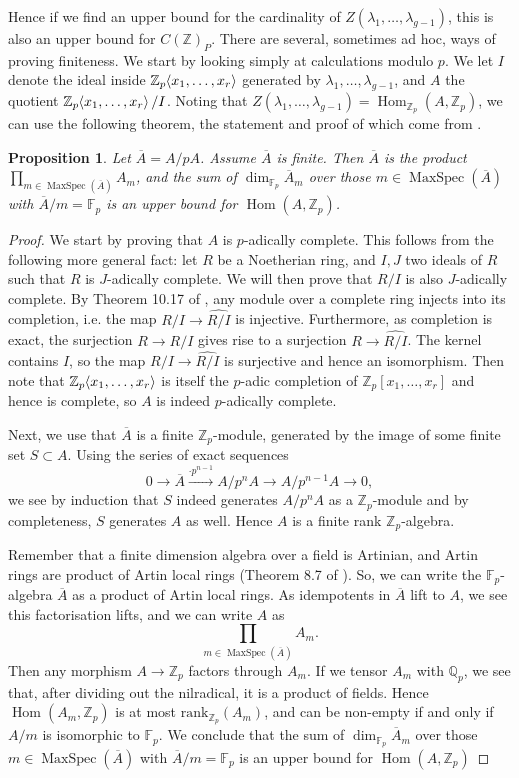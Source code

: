 \documentclass[12pt]{article}
\newcommand{\Z}{\mathbb{Z}}
\newcommand{\Q}{\mathbb{Q}}
\newcommand{\F}{\mathbb{F}}
\renewcommand{\angle}[1]{\hspace{-2pt}\left\langle #1 \right\rangle}
\DeclareMathOperator{\Hom}{Hom}
\DeclareMathOperator{\MaxSpec}{MaxSpec}
\theoremstyle{plain}
\newtheorem{prop}[thm]{Proposition} %
\theoremstyle{definition}
\theoremstyle{remark}
\begin{document}
Hence if we find an upper bound for the cardinality of $Z(\lambda_1,\dots,\lambda_{g-1})$, this is also an upper bound for $C(\Z)_P$. There are several, sometimes ad hoc, ways of proving finiteness. We start by looking simply at calculations modulo $p$. We let $I$ denote the ideal inside $\Z_p\angle{x_1,\dots,x_r}$ generated by $\lambda_1,\dots,\lambda_{g-1}$, and $A$ the quotient $\Z_p\angle{x_1,\dots,x_r}/I$. Noting that $Z(\lambda_1,\dots,\lambda_{g-1}) = \Hom_{\Z_p}(A,\Z_p)$, we can use the following theorem, the statement and proof of which come from \cite{edixhoven20}.

\begin{prop}
\label{prop:finedix}
Let $\overline{A} = A/pA$. Assume $\overline{A}$ is finite. Then $\overline{A}$ is the product $\prod_{m \in \MaxSpec(\overline{A})} A_m$, and the sum of $\dim_{\F_p} \overline{A}_m$ over those $m\in \MaxSpec(\overline{A})$ with $\overline{A}/m = \F_p$ is an upper bound for $\Hom(A,\Z_p)$.
\end{prop}
\begin{proof}
We start by proving that $A$ is $p$-adically complete. This follows from the following more general fact: let $R$ be a Noetherian ring, and $I,J$ two ideals of $R$ such that $R$ is $J$-adically complete. We will then prove that $R/I$ is also $J$-adically complete. By Theorem 10.17 of \cite{atiyah}, any module over a complete ring injects into its completion, i.e. the map $R/I \to \widehat{R/I}$ is injective. Furthermore, as completion is exact, the surjection $R \to R/I$ gives rise to a surjection $R \to \widehat{R/I}$. The kernel contains $I$, so the map $R/I \to \widehat{R/I}$ is surjective and hence an isomorphism. Then note that $\Z_p\angle{x_1,\dots,x_r}$ is itself the $p$-adic completion of $\Z_p[x_1,\dots,x_r]$ and hence is complete, so $A$ is indeed $p$-adically complete.

Next, we use that $\overline{A}$ is a finite $\Z_p$-module, generated by the image of some finite set $S \subset A$. Using the series of exact sequences \[0 \to \overline{A} \xrightarrow{\cdot p^{n-1}} A/p^nA \to A/p^{n-1}A \to 0,\] we see by induction that $S$ indeed generates $A/p^nA$ as a $\Z_p$-module and by completeness, $S$ generates $A$ as well. Hence $A$ is a finite rank $\Z_p$-algebra.

Remember that a finite dimension algebra over a field is Artinian, and Artin rings are product of Artin local rings (Theorem 8.7 of \cite{atiyah}). So, we can write the $\F_p$-algebra $\overline{A}$ as a product of Artin local rings. As idempotents in $\overline{A}$ lift to $A$, we see this factorisation lifts, and we can write $A$ as
\[
\prod_{m \in \MaxSpec(\overline{A})} A_m.
\]
Then any morphism $A \to \Z_p$ factors through $A_m$. If we tensor $A_m$ with $\Q_p$, we see that, after dividing out the nilradical, it is a product of fields. Hence $\Hom(A_m,\Z_p)$ is at most $\text{rank}_{\Z_p}(A_m)$, and can be non-empty if and only if $A/m$ is isomorphic to $\F_p$. We conclude that the sum of $\dim_{\F_p} \overline{A}_m$ over those $m\in \MaxSpec(\overline{A})$ with $\overline{A}/m = \F_p$ is an upper bound for $\Hom(A,\Z_p)$
\end{proof}
\end{document}
